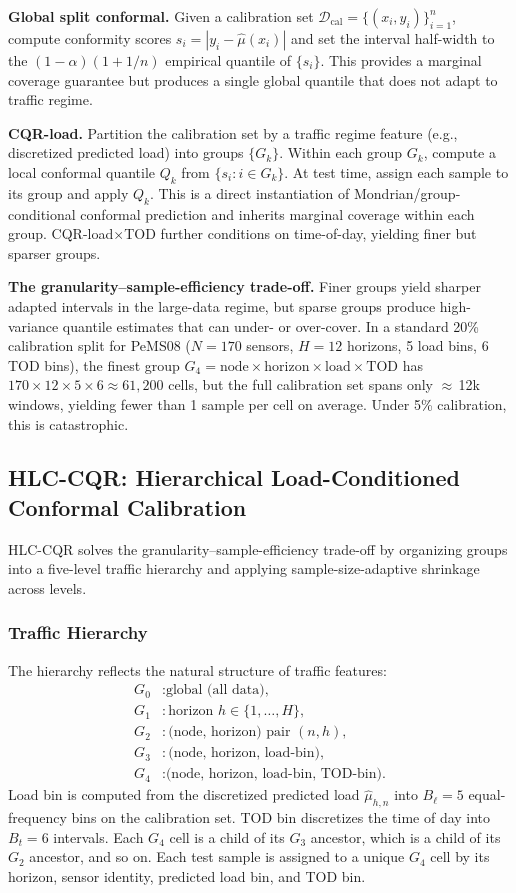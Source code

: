\documentclass[letterpaper,journal]{IEEEtran}
\begin{document}
\textbf{Global split conformal.}  Given a calibration set
$\mathcal{D}_\text{cal}=\{(x_i,y_i)\}_{i=1}^{n}$, compute conformity
scores $s_i=|y_i-\hat{\mu}(x_i)|$ and set the interval half-width to the
$(1-\alpha)(1+1/n)$ empirical quantile of $\{s_i\}$.  This provides a
marginal coverage guarantee but produces a single global quantile that does
not adapt to traffic regime.

\textbf{CQR-load.}  Partition the calibration set by a traffic regime
feature (e.g., discretized predicted load) into groups $\{G_k\}$.  Within
each group $G_k$, compute a local conformal quantile $Q_k$ from
$\{s_i : i\in G_k\}$.  At test time, assign each sample to its group and
apply $Q_k$.  This is a direct instantiation of Mondrian/group-conditional
conformal prediction and inherits marginal coverage within each group.
CQR-load$\times$TOD further conditions on time-of-day, yielding finer but
sparser groups.

\textbf{The granularity--sample-efficiency trade-off.}  Finer groups yield
sharper adapted intervals in the large-data regime, but sparse groups
produce high-variance quantile estimates that can under- or over-cover.  In
a standard 20\% calibration split for PeMS08 ($N{=}170$ sensors,
$H{=}12$ horizons, 5 load bins, 6 TOD bins), the finest group
$G_4=\text{node}\times\text{horizon}\times\text{load}\times\text{TOD}$ has
$170\times12\times5\times6\approx61{,}200$ cells, but the full calibration
set spans only $\approx$\,12k windows, yielding fewer than 1 sample per
cell on average.  Under 5\% calibration, this is catastrophic.

\subsection{HLC-CQR: Hierarchical Load-Conditioned Conformal Calibration}
\label{sec:hlccqr}

HLC-CQR solves the granularity--sample-efficiency trade-off by organizing
groups into a five-level traffic hierarchy and applying sample-size-adaptive
shrinkage across levels.

\subsubsection{Traffic Hierarchy}
The hierarchy reflects the natural structure of traffic features:
\begin{align}
    G_0 &: \text{global (all data),} \\
    G_1 &: \text{horizon } h \in \{1,\ldots,H\}, \\
    G_2 &: \text{(node, horizon) pair } (n,h), \\
    G_3 &: \text{(node, horizon, load-bin)}, \\
    G_4 &: \text{(node, horizon, load-bin, TOD-bin).}
\end{align}
Load bin is computed from the discretized predicted load $\hat{\mu}_{h,n}$
into $B_\ell=5$ equal-frequency bins on the calibration set.  TOD bin
discretizes the time of day into $B_t=6$ intervals.  Each $G_4$ cell is a
child of its $G_3$ ancestor, which is a child of its $G_2$ ancestor, and so
on.  Each test sample is assigned to a unique $G_4$ cell by its horizon,
sensor identity, predicted load bin, and TOD bin.
\end{document}
